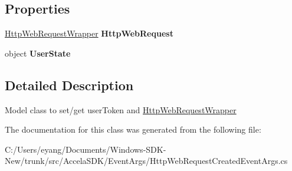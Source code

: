 \subsection*{Properties}
\begin{DoxyCompactItemize}
\item 
\hypertarget{class_accela_1_1_windows_store_s_d_k_1_1_http_web_request_created_event_args_ae56a45a6d7812cac4fb9bdec70ac63bb}{\hyperlink{class_accela_1_1_windows_store_s_d_k_1_1_http_web_request_wrapper}{Http\+Web\+Request\+Wrapper} {\bfseries Http\+Web\+Request}}\label{class_accela_1_1_windows_store_s_d_k_1_1_http_web_request_created_event_args_ae56a45a6d7812cac4fb9bdec70ac63bb}

\item 
\hypertarget{class_accela_1_1_windows_store_s_d_k_1_1_http_web_request_created_event_args_a547795619eba902dabfdc0774bf0f772}{object {\bfseries User\+State}}\label{class_accela_1_1_windows_store_s_d_k_1_1_http_web_request_created_event_args_a547795619eba902dabfdc0774bf0f772}

\end{DoxyCompactItemize}


\subsection{Detailed Description}
Model class to set/get user\+Token and \hyperlink{class_accela_1_1_windows_store_s_d_k_1_1_http_web_request_wrapper}{Http\+Web\+Request\+Wrapper} 



The documentation for this class was generated from the following file\+:\begin{DoxyCompactItemize}
\item 
C\+:/\+Users/eyang/\+Documents/\+Windows-\/\+S\+D\+K-\/\+New/trunk/src/\+Accela\+S\+D\+K/\+Event\+Args/Http\+Web\+Request\+Created\+Event\+Args.\+cs\end{DoxyCompactItemize}
